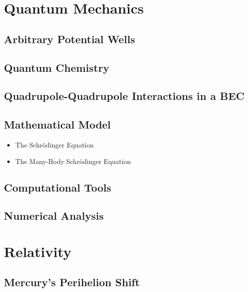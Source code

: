 \documentclass{report}
\begin{document}
\section{Quantum Mechanics} \label{sec:quantum}

    \subsection{Arbitrary Potential Wells}

    \subsection{Quantum Chemistry}

    \subsection{Quadrupole-Quadrupole Interactions in a BEC}









    \subsection{Mathematical Model}

        \begin{itemize}
            \item The Schr{\"o}dinger Equation
            \item The Many-Body Schr{\"o}dinger Equation
        \end{itemize}

    \subsection{Computational Tools}

    \subsection{Numerical Analysis}

\section{Relativity} \label{sec:relativity}

    \subsection{Mercury's Perihelion Shift}
\end{document}
